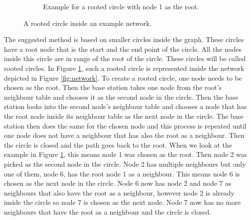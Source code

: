 \begin{figure}[htbp]
\begin{subfigure}[t]{0.4\textwidth}
        \caption{Example for a rooted circle with node 1 as the root.}
        \label{fig:rootedCircle}
    \end{subfigure}
    \label{fig:networkRootedCircle}
    \caption{A rooted circle inside an example network.}
\end{figure}

The suggested method is based on smaller circles inside the graph. These circles have a root node that is the start and the end point of the circle. All the nodes inside this circle are in range of the root of the circle. These circles will be called rooted circles. In Figure \ref{fig:rootedCircle}, such a rooted circle is represented inside the network depicted in Figure \ref{fig:network}. To create a rooted circle, one node needs to be chosen as the root. Then the base station takes one node from the root's neighbour table and chooses it as the second node in the circle.  Then the base station looks into the second node's neighbour table and chooses a node that has the root node inside its neighbour table as the next node in the circle. The base station then does the same for the chosen node and this process is repeated until one node does not have a neighbour that has also the root as a neighbour. Then the circle is closed and the path goes back to the root. When we look at the example in Figure \ref{fig:rootedCircle}, this means node 1 was chosen as the root. Then node 2 was picked as the second node in the circle. Node 2 has multiple neighbours but only one of them, node 6, has the root node 1 as a neighbour. This means node 6 is chosen as the next node in the circle. Node 6 now has node 2 and node 7 as neighbours that also have the root as a neighbour, however node 2 is already inside the circle so node 7 is chosen as the next node. Node 7 now has no more neighbours that have the root as a neighbour and the circle is closed.

